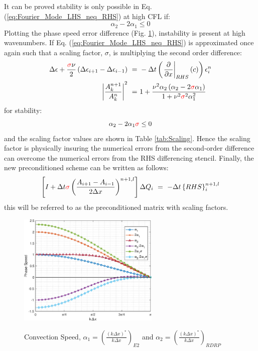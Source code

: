 \documentclass[conf]{new-aiaa}
\begin{document}
It can be proved stability is only possible in Eq. (\ref{eq:Fourier_Mode_LHS_neq_RHS}) at high CFL if:
\begin{equation*}
	\alpha_2-2\alpha_1 \leq 0
\end{equation*}
Plotting the phase speed error difference (Fig. \ref{fig:alpha_stability}), instability is present at high wavenumbers. If Eq. (\ref{eq:Fourier_Mode_LHS_neq_RHS}) is approximated once again such that a scaling factor, $\sigma$, is multiplying the second order difference:
\begin{equation}
	\begin{split}
		\label{eq:Fourier_Mode_LHS_neq_RHS_Scaling}
   			\Delta{\epsilon}+\frac{{\color{red}{\sigma}}\nu}{2}\left(\Delta{\epsilon_{i+1}}-\Delta{\epsilon_{i-1}} \right)~=&~-\Delta{t}\left(\left.\frac{\partial}{\partial{x}}\right|_{RHS}\left( c \right)\right) {\epsilon}_i^{n} \\
  			\left|\frac{A_k^{n+1}}{A_k^{n}} \right|^2~=&~1+\frac{\nu^2\alpha_2\left(\alpha_2-2{\color{red}{\sigma}}\alpha_1\right)}{1+\nu^2{\color{red}{\sigma}}^2\alpha_1^2}
	\end{split}
\end{equation}
for stability:
\begin{equation*}
	\alpha_2-2\alpha_1{\color{red}{\sigma}} \leq 0
\end{equation*}
and the scaling factor values are shown in Table \ref{tab:Scaling}. Hence the scaling factor is physically insuring the numerical errors from the second-order difference can overcome the numerical errors from the RHS differencing stencil. Finally, the new preconditioned scheme can be written as follows: 
\begin{equation}
	\label{eq:TriDi_NS_Scaling}
  		\left[I+\Delta{t}{\color{red}{\sigma}}\left(\frac{A_{i+1}-A_{i-1}}{2\Delta{x}}\right)^{n+1,l}\right]\Delta{Q}_i~=~-\Delta{t}\left\{RHS\right\}_i^{n+1, l}
\end{equation}
this will be referred to as the preconditioned matrix with scaling factors. 


\begin{figure}[hbt!]
	\centering
	{\includegraphics[width=0.6\textwidth]{Phase_2alpha_sigma}}
	\caption{Convection Speed, $\alpha_1=\left(\frac{\left(k\Delta{x}\right)^*}{k\Delta{x}} \right)_{E2}$ and $\alpha_2=\left(\frac{\left(k\Delta{x}\right)^*}{k\Delta{x}} \right)_{RDRP}$}
	\label{fig:alpha_stability}
\end{figure}
\end{document}
